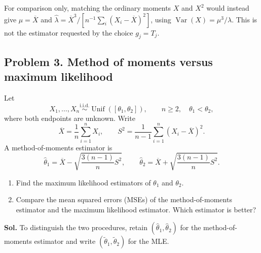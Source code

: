 \documentclass[lang=en,11pt,a4paper,citestyle=authoryear]{elegantpaper}
\begin{document}
\begin{enumerate}[label=(\alph*),leftmargin=*]
\begin{enumerate}[label=(\roman*),leftmargin=*]
For comparison only, matching the ordinary moments $X$ and $X^2$
would instead give $\widehat\mu=\overline X$ and
$\widehat\lambda=\overline X^3/
[n^{-1}\sum_i(X_i-\overline X)^2]$, using
$\operatorname{Var}(X)=\mu^3/\lambda$.
This is not the estimator requested by the choice $g_j=T_j$.
\end{enumerate}
\end{enumerate}

\subsection*{Problem 3. Method of moments versus maximum likelihood}
Let
\[
X_1,\ldots,X_n\overset{\mathrm{i.i.d.}}{\sim}
\operatorname{Unif}([\theta_1,\theta_2]),
\qquad n\ge2,\quad\theta_1<\theta_2,
\]
where both endpoints are unknown. Write
\[
\overline X=\frac1n\sum_{i=1}^nX_i,
\qquad
S^2=\frac1{n-1}\sum_{i=1}^n(X_i-\overline X)^2.
\]
A method-of-moments estimator is
\[
\widehat\theta_1
=\overline X-\sqrt{\frac{3(n-1)}n S^2},
\qquad
\widehat\theta_2
=\overline X+\sqrt{\frac{3(n-1)}n S^2}.
\]
\begin{enumerate}[label=(\roman*),leftmargin=*]
\item Find the maximum likelihood estimators of $\theta_1$ and $\theta_2$.
\item Compare the mean squared errors (MSEs) of the
method-of-moments estimator and the maximum likelihood estimator.
Which estimator is better?
\end{enumerate}

\par\vspace{0.5em}
\noindent\textbf{Sol.}
To distinguish the two procedures, retain
$(\widehat\theta_1,\widehat\theta_2)$ for the method-of-moments
estimator and write
$(\widetilde\theta_1,\widetilde\theta_2)$ for the MLE.
\end{document}
